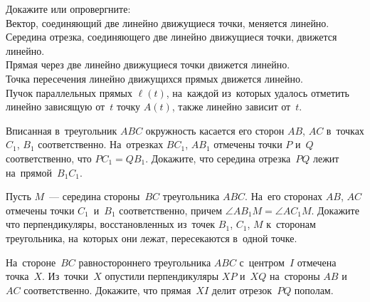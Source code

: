 \begin{problems}



\item
Докажите или опровергните:
\\
\subproblem
Вектор, соединяющий две линейно движущиеся точки, меняется линейно.
\\
\subproblem
Середина отрезка, соединяющего две линейно движущиеся точки, движется линейно.
\\
\subproblem
Прямая через две линейно движущиеся точки движется линейно.
\\
\subproblem
Точка пересечения линейно движущихся прямых движется линейно.
\\
\subproblem
Пучок параллельных прямых $\ell(t)$, на~каждой из~которых удалось отметить
линейно зависящую от~$t$ точку $A(t)$, также линейно зависит от~$t$.

\item
Вписанная в~треугольник $ABC$ окружность касается его сторон $AB$, $AC$
в~точках $C_1$, $B_1$ соответственно.
На~отрезках $BC_{1}$, $AB_{1}$ отмечены точки $P$ и~$Q$ соответственно, что
$PC_{1} = QB_{1}$.
Докажите, что середина отрезка~$PQ$ лежит на~прямой~$B_{1}C_{1}$.


\item
Пусть $M$~--- середина стороны~$BC$ треугольника $ABC$.
На~его сторонах $AB$, $AC$ отмечены точки $C_1$~и~$B_1$ соответственно, причем
$\angle AB_{1}M = \angle AC_{1}M$.
Докажите что перпендикуляры, восстановленных из~точек $B_1$, $C_1$, $M$
к~сторонам треугольника, на~которых они лежат, пересекаются в~одной точке.

\item
На~стороне~$BC$ равностороннего треугольника $ABC$ с~центром~$I$ отмечена
точка~$X$.
Из~точки~$X$ опустили перпендикуляры $XP$ и~$XQ$ на~стороны $AB$ и~$AC$
соответственно.
Докажите, что прямая~$XI$ делит отрезок~$PQ$ пополам.


\end{problems}
